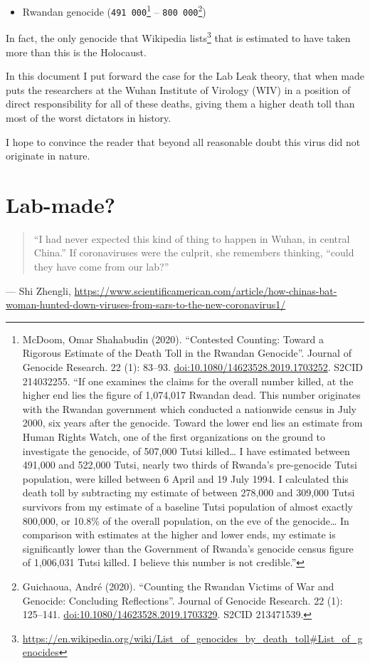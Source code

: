 \documentclass[11pt]{article}
\begin{document}
\begin{itemize}
\item Rwandan genocide (\texttt{491 000}\footnote{McDoom, Omar Shahabudin (2020). ``Contested Counting: Toward a Rigorous Estimate of the Death Toll in the Rwandan Genocide''. Journal of Genocide Research. 22 (1): 83–93. \href{https://doi.org/10.1080/14623528.2019.1703252}{doi:10.1080/14623528.2019.1703252}. S2CID 214032255. ``If one examines the claims for the overall number killed, at the higher end lies the figure of 1,074,017 Rwandan dead. This number originates with the Rwandan government which conducted a nationwide census in July 2000, six years after the genocide. Toward the lower end lies an estimate from Human Rights Watch, one of the first organizations on the ground to investigate the genocide, of 507,000 Tutsi killed\ldots{} I have estimated between 491,000 and 522,000 Tutsi, nearly two thirds of Rwanda’s pre-genocide Tutsi population, were killed between 6 April and 19 July 1994. I calculated this death toll by subtracting my estimate of between 278,000 and 309,000 Tutsi survivors from my estimate of a baseline Tutsi population of almost exactly 800,000, or 10.8\% of the overall population, on the eve of the genocide\ldots{} In comparison with estimates at the higher and lower ends, my estimate is significantly lower than the Government of Rwanda’s genocide census figure of 1,006,031 Tutsi killed. I believe this number is not credible.''} -- \texttt{800 000}\footnote{Guichaoua, André (2020). ``Counting the Rwandan Victims of War and Genocide: Concluding Reflections''. Journal of Genocide Research. 22 (1): 125–141. \href{https://doi.org/10.1080/14623528.2019.1703329}{doi:10.1080/14623528.2019.1703329}. S2CID 213471539.})
\end{itemize}

In fact, the only genocide that Wikipedia lists\footnote{\url{https://en.wikipedia.org/wiki/List\_of\_genocides\_by\_death\_toll\#List\_of\_genocides}} that is estimated to have taken more than this is the Holocaust.

In this document I put forward the case for the Lab Leak theory, that when made puts the researchers at the Wuhan Institute of Virology (WIV) in a position of direct responsibility for all of these deaths, giving them a higher death toll than most of the worst dictators in history.

I hope to convince the reader that beyond all reasonable doubt this virus did not originate in nature.
\section{Lab-made?}
\label{sec:orgde533f0}
\begin{quote}
“I had never expected this kind of thing to happen in Wuhan, in central China.” If coronaviruses were the culprit, she remembers thinking, “could they have come from our lab?”
\end{quote}
--- Shi Zhengli, \url{https://www.scientificamerican.com/article/how-chinas-bat-woman-hunted-down-viruses-from-sars-to-the-new-coronavirus1/}
\end{document}
